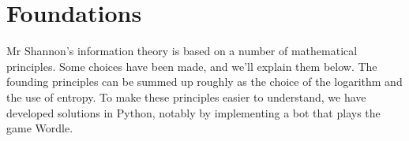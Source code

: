 \section{Foundations}

Mr Shannon's information theory is based on a number of mathematical principles. Some choices have been made, and we'll explain them below. The founding principles can be summed up roughly as the choice of the logarithm and the use of entropy. To make these principles easier to understand, we have developed solutions in Python, notably by implementing a bot that plays the game Wordle.



